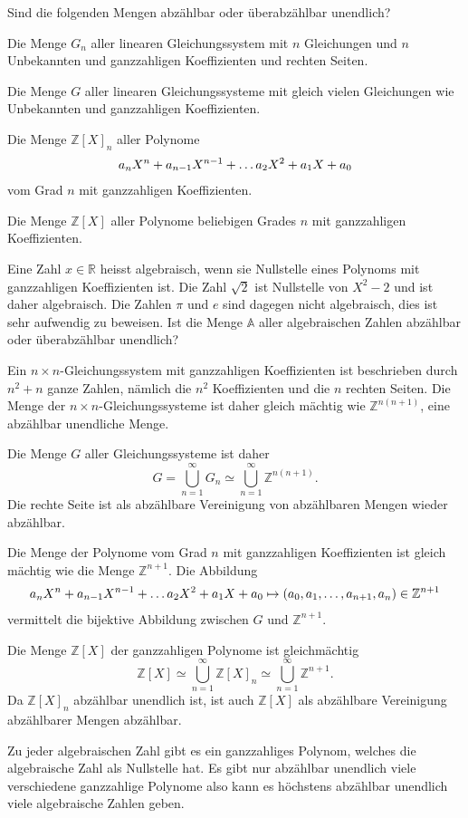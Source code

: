 Sind die folgenden Mengen abzählbar oder überabzählbar unendlich?
\begin{teilaufgaben}
\item
Die Menge $G_n$ aller linearen Gleichungssystem mit $n$ Gleichungen
und $n$ Unbekannten und ganzzahligen Koeffizienten und rechten Seiten.
\item
Die Menge $G$ aller linearen Gleichungssysteme mit gleich vielen Gleichungen
wie Unbekannten und ganzzahligen Koeffizienten.
\item
Die Menge $\mathbb Z[X]_n$ aller Polynome
\[
a_{\mathstrut n}X^n+a_{n-1}X^{n-1}+\dots a_2X^2+a_1X+a_0
\]
vom Grad $n$ mit ganzzahligen Koeffizienten.
\item
Die Menge $\mathbb Z[X]$ aller Polynome
beliebigen Grades $n$ mit ganzzahligen Koeffizienten.
\item
Eine Zahl $x\in \mathbb R$ heisst algebraisch, wenn sie Nullstelle
eines Polynoms mit ganzzahligen Koeffizienten ist.
Die Zahl $\sqrt{2}$ ist Nullstelle von $X^2-2$ und ist daher algebraisch.
Die Zahlen $\pi$ und $e$ sind dagegen nicht algebraisch, dies ist sehr
aufwendig zu beweisen.
Ist die Menge $\mathbb{A}$ aller algebraischen Zahlen abzählbar oder
überabzählbar unendlich?
\end{teilaufgaben}


\begin{loesung}
\begin{teilaufgaben}
\item
Ein $n\times n$-Gleichungssystem mit ganzzahligen 
Koeffizienten ist beschrieben durch $n^2+n$ ganze Zahlen, nämlich
die $n^2$ Koeffizienten und die $n$ rechten Seiten.
Die Menge der $n\times n$-Gleichungssysteme ist daher gleich
mächtig wie $\mathbb Z^{n(n+1)}$, eine abzählbar unendliche Menge.
\item
Die Menge $G$ aller Gleichungssysteme ist daher 
\[
G = \bigcup_{n=1}^\infty G_n \simeq \bigcup_{n=1}^\infty \mathbb Z^{n(n+1)}.
\]
Die rechte Seite ist als abzählbare Vereinigung von abzählbaren Mengen
wieder abzählbar.
\item
Die Menge der Polynome vom Grad $n$ mit ganzzahligen Koeffizienten
ist gleich mächtig wie die Menge $\mathbb Z^{n+1}$.
Die Abbildung
\[
a_{\mathstrut n}X^n+a_{n-1}X^{n-1}+\dots a_2X^2+a_1X+a_0
\mapsto
(a_0,a_1,\dots,a_{n+1},a_{\mathstrut n}) \in \mathbb{Z}^{n+1}
\]
vermittelt die bijektive Abbildung zwischen $G$ und $\mathbb Z^{n+1}$.
\item
Die Menge $\mathbb Z[X]$ der ganzzahligen Polynome ist gleichmächtig
\[
\mathbb Z[X]
\simeq
\bigcup_{n=1}^\infty \mathbb Z[X]_n
\simeq
\bigcup_{n=1}^\infty \mathbb Z^{n+1}.
\]
Da $\mathbb Z[X]_n$ abzählbar unendlich ist, ist auch $\mathbb Z[X]$
als abzählbare Vereinigung abzählbarer Mengen abzählbar.
\item
Zu jeder algebraischen Zahl gibt es ein ganzzahliges Polynom, welches
die algebraische Zahl als Nullstelle hat.
Es gibt nur abzählbar unendlich viele verschiedene ganzzahlige Polynome
also kann es höchstens abzählbar unendlich viele algebraische Zahlen geben.
\qedhere
\end{teilaufgaben}
\end{loesung}


